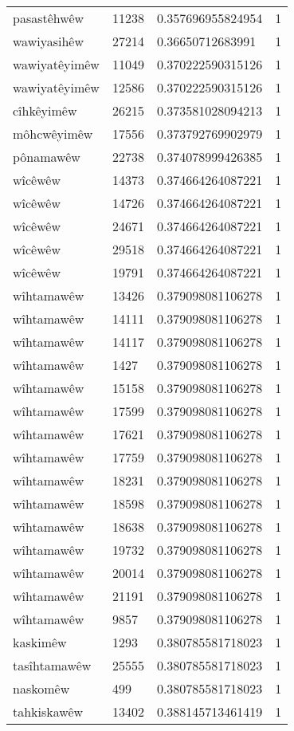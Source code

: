 \begin{longtable}{llll}
pasastêhwêw & 11238 & 0.357696955824954 & 1\\
wawiyasihêw & 27214 & 0.36650712683991 & 1\\
wawiyatêyimêw & 11049 & 0.370222590315126 & 1\\
wawiyatêyimêw & 12586 & 0.370222590315126 & 1\\
cîhkêyimêw & 26215 & 0.373581028094213 & 1\\
môhcwêyimêw & 17556 & 0.373792769902979 & 1\\
pônamawêw & 22738 & 0.374078999426385 & 1\\
wîcêwêw & 14373 & 0.374664264087221 & 1\\
wîcêwêw & 14726 & 0.374664264087221 & 1\\
wîcêwêw & 24671 & 0.374664264087221 & 1\\
wîcêwêw & 29518 & 0.374664264087221 & 1\\
wîcêwêw & 19791 & 0.374664264087221 & 1\\
wîhtamawêw & 13426 & 0.379098081106278 & 1\\
wîhtamawêw & 14111 & 0.379098081106278 & 1\\
wîhtamawêw & 14117 & 0.379098081106278 & 1\\
wîhtamawêw & 1427 & 0.379098081106278 & 1\\
wîhtamawêw & 15158 & 0.379098081106278 & 1\\
wîhtamawêw & 17599 & 0.379098081106278 & 1\\
wîhtamawêw & 17621 & 0.379098081106278 & 1\\
wîhtamawêw & 17759 & 0.379098081106278 & 1\\
wîhtamawêw & 18231 & 0.379098081106278 & 1\\
wîhtamawêw & 18598 & 0.379098081106278 & 1\\
wîhtamawêw & 18638 & 0.379098081106278 & 1\\
wîhtamawêw & 19732 & 0.379098081106278 & 1\\
wîhtamawêw & 20014 & 0.379098081106278 & 1\\
wîhtamawêw & 21191 & 0.379098081106278 & 1\\
wîhtamawêw & 9857 & 0.379098081106278 & 1\\
kaskimêw & 1293 & 0.380785581718023 & 1\\
tasîhtamawêw & 25555 & 0.380785581718023 & 1\\
naskomêw & 499 & 0.380785581718023 & 1\\
tahkiskawêw & 13402 & 0.388145713461419 & 1\\

\end{longtable}
